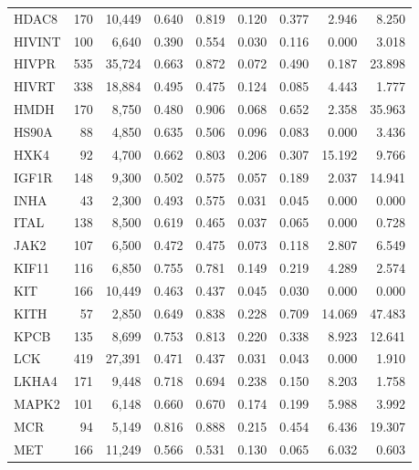 \begin{center}
\begin{longtable}{lrrrrrrrr}
			HDAC8  & 170   & 10,449   & 0.640   & 0.819   & 0.120   & 0.377   & 2.946   & 8.250  \\
			HIVINT & 100   & 6,640    & 0.390   & 0.554   & 0.030   & 0.116   & 0.000   & 3.018  \\
			HIVPR  & 535   & 35,724   & 0.663   & 0.872   & 0.072   & 0.490   & 0.187   & 23.898 \\
			HIVRT  & 338   & 18,884   & 0.495   & 0.475   & 0.124   & 0.085   & 4.443   & 1.777  \\
			HMDH   & 170   & 8,750    & 0.480   & 0.906   & 0.068   & 0.652   & 2.358   & 35.963 \\
			HS90A  & 88    & 4,850    & 0.635   & 0.506   & 0.096   & 0.083   & 0.000   & 3.436  \\
			HXK4   & 92    & 4,700    & 0.662   & 0.803   & 0.206   & 0.307   & 15.192  & 9.766  \\
			IGF1R  & 148   & 9,300    & 0.502   & 0.575   & 0.057   & 0.189   & 2.037   & 14.941 \\
			INHA   & 43    & 2,300    & 0.493   & 0.575   & 0.031   & 0.045   & 0.000   & 0.000  \\
			ITAL   & 138   & 8,500    & 0.619   & 0.465   & 0.037   & 0.065   & 0.000   & 0.728  \\
			JAK2   & 107   & 6,500    & 0.472   & 0.475   & 0.073   & 0.118   & 2.807   & 6.549  \\
			KIF11  & 116   & 6,850    & 0.755   & 0.781   & 0.149   & 0.219   & 4.289   & 2.574  \\
			KIT    & 166   & 10,449   & 0.463   & 0.437   & 0.045   & 0.030   & 0.000   & 0.000  \\
			KITH   & 57    & 2,850    & 0.649   & 0.838   & 0.228   & 0.709   & 14.069  & 47.483 \\
			KPCB   & 135   & 8,699    & 0.753   & 0.813   & 0.220   & 0.338   & 8.923   & 12.641 \\
			LCK    & 419   & 27,391   & 0.471   & 0.437   & 0.031   & 0.043   & 0.000   & 1.910  \\
			LKHA4  & 171   & 9,448    & 0.718   & 0.694   & 0.238   & 0.150   & 8.203   & 1.758  \\
			MAPK2  & 101   & 6,148    & 0.660   & 0.670   & 0.174   & 0.199   & 5.988   & 3.992  \\
			MCR    & 94    & 5,149    & 0.816   & 0.888   & 0.215   & 0.454   & 6.436   & 19.307 \\
			MET    & 166   & 11,249   & 0.566   & 0.531   & 0.130   & 0.065   & 6.032   & 0.603  \\

\end{longtable}
\end{center}
